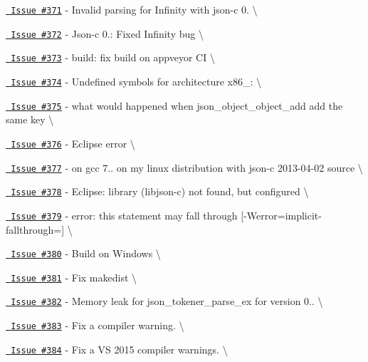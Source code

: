 \begin{DoxyItemize}
\item \href{https://github.com/json-c/json-c/issues/371}{\texttt{ Issue \#371}} -\/ Invalid parsing for Infinity with json-\/c 0. \textbackslash{}
\item \href{https://github.com/json-c/json-c/issues/372}{\texttt{ Issue \#372}} -\/ Json-\/c 0.\+: Fixed Infinity bug \textbackslash{}
\item \href{https://github.com/json-c/json-c/issues/373}{\texttt{ Issue \#373}} -\/ build\+: fix build on appveyor CI \textbackslash{}
\item \href{https://github.com/json-c/json-c/issues/374}{\texttt{ Issue \#374}} -\/ Undefined symbols for architecture x86\+\_\+: \textbackslash{}
\item \href{https://github.com/json-c/json-c/issues/375}{\texttt{ Issue \#375}} -\/ what would happened when json\+\_\+object\+\_\+object\+\_\+add add the same key \textbackslash{}
\item \href{https://github.com/json-c/json-c/issues/376}{\texttt{ Issue \#376}} -\/ Eclipse error \textbackslash{}
\item \href{https://github.com/json-c/json-c/issues/377}{\texttt{ Issue \#377}} -\/ on gcc 7.. on my linux distribution with json-\/c 2013-\/04-\/02 source \textbackslash{}
\item \href{https://github.com/json-c/json-c/issues/378}{\texttt{ Issue \#378}} -\/ Eclipse\+: library (libjson-\/c) not found, but configured \textbackslash{}
\item \href{https://github.com/json-c/json-c/issues/379}{\texttt{ Issue \#379}} -\/ error\+: this statement may fall through \mbox{[}-\/Werror=implicit-\/fallthrough=\mbox{]} \textbackslash{}
\item \href{https://github.com/json-c/json-c/issues/380}{\texttt{ Issue \#380}} -\/ Build on Windows \textbackslash{}
\item \href{https://github.com/json-c/json-c/issues/381}{\texttt{ Issue \#381}} -\/ Fix makedist \textbackslash{}
\item \href{https://github.com/json-c/json-c/issues/382}{\texttt{ Issue \#382}} -\/ Memory leak for json\+\_\+tokener\+\_\+parse\+\_\+ex for version 0.. \textbackslash{}
\item \href{https://github.com/json-c/json-c/issues/383}{\texttt{ Issue \#383}} -\/ Fix a compiler warning. \textbackslash{}
\item \href{https://github.com/json-c/json-c/issues/384}{\texttt{ Issue \#384}} -\/ Fix a VS 2015 compiler warnings. \textbackslash{} 
\end{DoxyItemize}